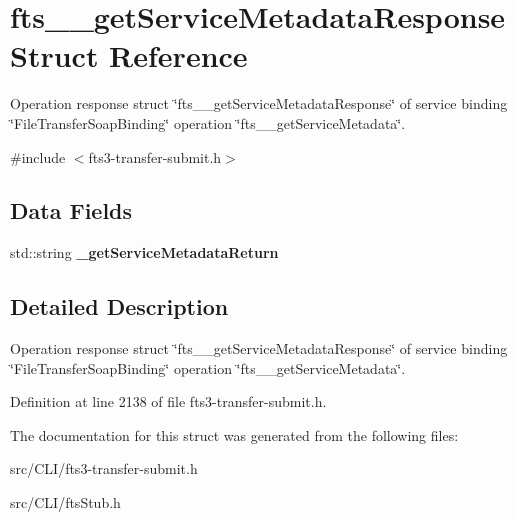 \section{fts\_\-\_\-getServiceMetadataResponse Struct Reference}
\label{structfts____getServiceMetadataResponse}


Operation response struct \char`\"{}fts\_\-\_\-getServiceMetadataResponse\char`\"{} of service binding \char`\"{}FileTransferSoapBinding\char`\"{} operation \char`\"{}fts\_\-\_\-getServiceMetadata\char`\"{}.  




{\ttfamily \#include $<$fts3-\/transfer-\/submit.h$>$}

\subsection*{Data Fields}
\begin{DoxyCompactItemize}
\item 
std::string {\bfseries \_\-getServiceMetadataReturn}\label{structfts____getServiceMetadataResponse_ad8010ba6c1a1c7c5ef9bf22293b3ab68}

\end{DoxyCompactItemize}


\subsection{Detailed Description}
Operation response struct \char`\"{}fts\_\-\_\-getServiceMetadataResponse\char`\"{} of service binding \char`\"{}FileTransferSoapBinding\char`\"{} operation \char`\"{}fts\_\-\_\-getServiceMetadata\char`\"{}. 

Definition at line 2138 of file fts3-\/transfer-\/submit.h.



The documentation for this struct was generated from the following files:\begin{DoxyCompactItemize}
\item 
src/CLI/fts3-\/transfer-\/submit.h\item 
src/CLI/ftsStub.h\end{DoxyCompactItemize}
